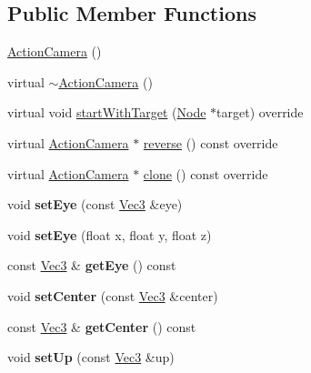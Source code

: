 \subsection*{Public Member Functions}
\begin{DoxyCompactItemize}
\item 
\hyperlink{classActionCamera_aba843023a08e9e7514df2f3c8ac716fd}{Action\+Camera} ()
\item 
virtual \hyperlink{classActionCamera_a3db23be122cafb96ae503c086d47bafd}{$\sim$\+Action\+Camera} ()
\item 
virtual void \hyperlink{classActionCamera_ab523607be45f90017decf4c5e493c733}{start\+With\+Target} (\hyperlink{classNode}{Node} $\ast$target) override
\item 
virtual \hyperlink{classActionCamera}{Action\+Camera} $\ast$ \hyperlink{classActionCamera_aeac79c93c92de723838a30e59fb011a9}{reverse} () const override
\item 
virtual \hyperlink{classActionCamera}{Action\+Camera} $\ast$ \hyperlink{classActionCamera_a316b7994753b978c45dbe150d6a711e5}{clone} () const override
\item 
\mbox{\label{classActionCamera_a19eb5d4bf00ccb0a13c7f5be78042fe6}} 
void {\bfseries set\+Eye} (const \hyperlink{classVec3}{Vec3} \&eye)
\item 
\mbox{\label{classActionCamera_a470c453238c67825603e2e1c01301e27}} 
void {\bfseries set\+Eye} (float x, float y, float z)
\item 
\mbox{\label{classActionCamera_a66c00d7a06d8f0d0e86dd4712a584ed5}} 
const \hyperlink{classVec3}{Vec3} \& {\bfseries get\+Eye} () const
\item 
\mbox{\label{classActionCamera_aecba6dd33e345dcb67597dc530b6ec5e}} 
void {\bfseries set\+Center} (const \hyperlink{classVec3}{Vec3} \&center)
\item 
\mbox{\label{classActionCamera_aa77878c823b046664f4203adb4a4b334}} 
const \hyperlink{classVec3}{Vec3} \& {\bfseries get\+Center} () const
\item 
\mbox{\label{classActionCamera_a4d77a6770dd0a7388023d8080bdd89aa}} 
void {\bfseries set\+Up} (const \hyperlink{classVec3}{Vec3} \&up)

\end{DoxyCompactItemize}
